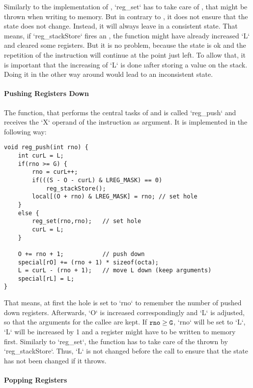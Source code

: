 Similarly to the implementation of , `reg_set` has to take care of , that might be thrown when writing to memory. But in contrary to , it does not ensure that the state does not change. Instead, it will always leave in a consistent state. That means, if `reg_stackStore` fires an , the function might have already increased `L` and cleared some registers. But it is no problem, because the state is ok and the repetition of the instruction will continue at the point just left. To allow that, it is important that the increasing of `L` is done \i{after} storing a value on the stack. Doing it in the other way around would lead to an inconsistent state.

\paragraph{Pushing Registers Down}

The function, that performs the central tasks of  and  is called `reg_push` and receives the `X` operand of the instruction as argument. It is implemented in the following way:
\begin{lstlisting}[language=GIMMIXC,caption=Implementation of {\tt reg\_push}]
void reg_push(int rno) {
	int curL = L;
	if(rno >= G) {
		rno = curL++;
		if(((S - O - curL) & LREG_MASK) == 0)
			reg_stackStore();
		local[(O + rno) & LREG_MASK] = rno;	// set hole
	}
	else {
		reg_set(rno,rno);	// set hole
		curL = L;
	}

	O += rno + 1;			// push down
	special[rO] += (rno + 1) * sizeof(octa);
	L = curL - (rno + 1);	// move L down (keep arguments)
	special[rL] = L;
}
\end{lstlisting}
That means, at first the hole is set to `rno` to remember the number of pushed down registers. Afterwards, `O` is increased correspondingly and `L` is adjusted, so that the arguments for the callee are kept. If ${\tt rno} \ge {\tt G}$, `rno` will be set to `L`, `L` will be increased by 1 and a register might have to be written to memory first. Similarly to `reg_set`, the function has to take care of the  thrown by `reg_stackStore`. Thus, `L` is not changed before the call to ensure that the state has not been changed if it throws.

\paragraph{Popping Registers}

